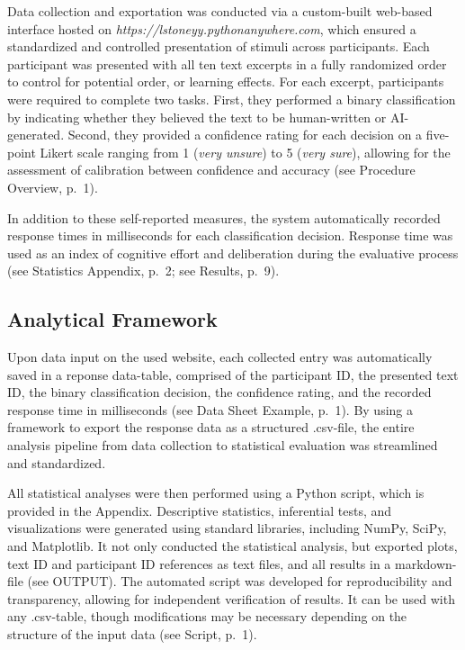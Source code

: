 \documentclass[12pt]{article}
\begin{document}
Data collection and exportation was conducted via a custom-built web-based interface hosted on \textit{https://lstoneyy.pythonanywhere.com}, which ensured a standardized and controlled presentation of stimuli across participants. Each participant was presented with all ten text excerpts in a fully randomized order to control for potential order, or learning effects.
For each excerpt, participants were required to complete two tasks. First, they performed a binary classification by indicating whether they believed the text to be human-written or AI-generated. Second, they provided a confidence rating for each decision on a five-point Likert scale ranging from 1 (\emph{very unsure}) to 5 (\emph{very sure}), allowing for the assessment of calibration between confidence and accuracy (see Procedure Overview, p.~1).

In addition to these self-reported measures, the system automatically recorded response times in milliseconds for each classification decision. Response time was used as an index of cognitive effort and deliberation during the evaluative process (see Statistics Appendix, p.~2; see Results, p.~9).

\subsection{Analytical Framework}

Upon data input on the used website, each collected entry was automatically saved in a reponse data-table, comprised of the participant ID, the presented text ID, the binary classification decision, the confidence rating, and the recorded response time in milliseconds (see Data Sheet Example, p.~1). By using a framework to export the response data as a structured .csv-file, the entire analysis pipeline from data collection to statistical evaluation was streamlined and standardized.

All statistical analyses were then performed using a Python script, which is provided in the Appendix. Descriptive statistics, inferential tests, and visualizations were generated using standard libraries, including NumPy, SciPy, and Matplotlib. It not only conducted the statistical analysis, but exported plots, text ID and participant ID references as text files, and all results in a markdown-file (see OUTPUT). The automated script was developed for reproducibility and transparency, allowing for independent verification of results. It can be used with any .csv-table, though modifications may be necessary depending on the structure of the input data (see Script, p.~1). 
\end{document}
